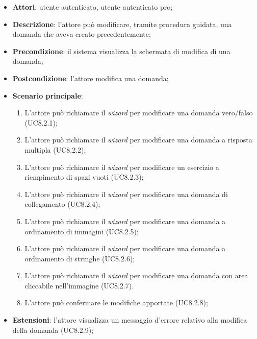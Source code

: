 	\begin{itemize}
		\item
			\textbf{Attori}: utente autenticato, utente autenticato pro;
		\item		
			\textbf{Descrizione}: l'attore può modificare, tramite procedura guidata, una domanda che aveva creato precedentemente;
		\item
			\textbf{Precondizione}: il sistema visualizza la schermata di modifica di una domanda;
		\item
			\textbf{Postcondizione}: l'attore modifica una domanda;
		\item
			\textbf{Scenario principale}:
				\begin{enumerate} 
					\item
					L'attore può richiamare il \textit{wizard} per modificare una domanda vero/falso (UC8.2.1);
					\item
					L'attore può richiamare il \textit{wizard} per modificare una domanda a risposta multipla (UC8.2.2);
					\item
					L'attore può richiamare il \textit{wizard} per modificare un esercizio a riempimento di spazi vuoti (UC8.2.3);
					\item
					L'attore può richiamare il \textit{wizard} per modificare una domanda di collegamento (UC8.2.4);
					\item
					L'attore può richiamare il \textit{wizard} per modificare una domanda a ordinamento di immagini (UC8.2.5);
					\item
					L'attore può richiamare il \textit{wizard} per modificare una domanda a ordinamento di stringhe (UC8.2.6);
					\item
					L'attore può richiamare il \textit{wizard} per modificare una domanda con area cliccabile nell'immagine (UC8.2.7).
					\item
					L'attore può confermare le modifiche apportate (UC8.2.8);
				\end{enumerate}	
	 	\item
			\textbf{Estensioni}: l'attore visualizza un messaggio d'errore relativo alla modifica della domanda (UC8.2.9);
	\end{itemize}
	








